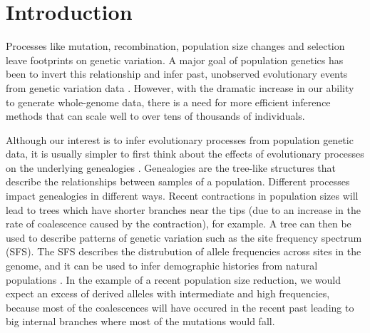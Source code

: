 \section{Introduction}

Processes like mutation, recombination, population size changes and selection leave footprints on genetic variation.
A major goal of population genetics has been to invert this relationship and infer past, unobserved evolutionary events from genetic variation data \citep{schraiber_methods_2015}.
However, with the dramatic increase in our ability to generate whole-genome data,
there is a need for more efficient inference methods that can scale well to over tens of thousands of individuals.

Although our interest is to infer evolutionary processes from population genetic data,
it is usually simpler to first think about the effects of evolutionary processes on the underlying genealogies \citep{wakely_coalescent_2016}.
Genealogies are the tree-like structures that describe the relationships between samples of a population.
Different processes impact genealogies in different ways.
Recent contractions in population sizes will lead to trees which have shorter branches near the tips (due to an increase in the rate of coalescence caused by the contraction), for example.
A tree can then be used to describe patterns of genetic variation such as the site frequency spectrum (SFS).
The SFS describes the distrubution of allele frequencies across sites in the genome,
and it can be used to infer demographic histories from natural populations \citep{gutenkunst_inferring_2009, schraiber_methods_2015}.
In the example of a recent population size reduction,
we would expect an excess of derived alleles with intermediate and high frequencies,
because most of the coalescences will have occured in the recent past leading to big internal branches where most of the mutations would fall.


